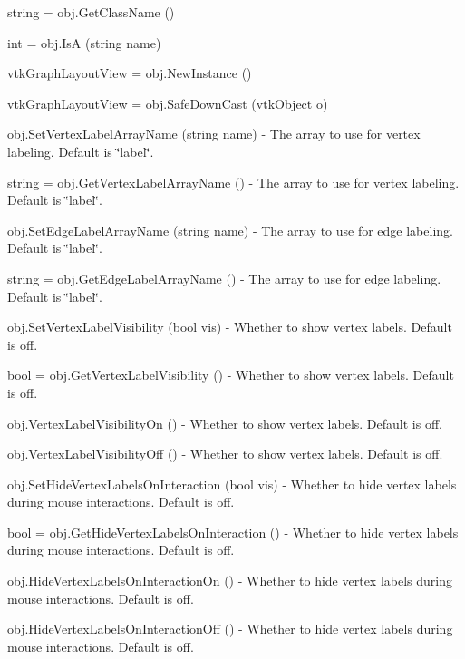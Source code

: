 \begin{DoxyItemize}
\item {\ttfamily string = obj.\-Get\-Class\-Name ()}  
\item {\ttfamily int = obj.\-Is\-A (string name)}  
\item {\ttfamily vtk\-Graph\-Layout\-View = obj.\-New\-Instance ()}  
\item {\ttfamily vtk\-Graph\-Layout\-View = obj.\-Safe\-Down\-Cast (vtk\-Object o)}  
\item {\ttfamily obj.\-Set\-Vertex\-Label\-Array\-Name (string name)} -\/ The array to use for vertex labeling. Default is \char`\"{}label\char`\"{}.  
\item {\ttfamily string = obj.\-Get\-Vertex\-Label\-Array\-Name ()} -\/ The array to use for vertex labeling. Default is \char`\"{}label\char`\"{}.  
\item {\ttfamily obj.\-Set\-Edge\-Label\-Array\-Name (string name)} -\/ The array to use for edge labeling. Default is \char`\"{}label\char`\"{}.  
\item {\ttfamily string = obj.\-Get\-Edge\-Label\-Array\-Name ()} -\/ The array to use for edge labeling. Default is \char`\"{}label\char`\"{}.  
\item {\ttfamily obj.\-Set\-Vertex\-Label\-Visibility (bool vis)} -\/ Whether to show vertex labels. Default is off.  
\item {\ttfamily bool = obj.\-Get\-Vertex\-Label\-Visibility ()} -\/ Whether to show vertex labels. Default is off.  
\item {\ttfamily obj.\-Vertex\-Label\-Visibility\-On ()} -\/ Whether to show vertex labels. Default is off.  
\item {\ttfamily obj.\-Vertex\-Label\-Visibility\-Off ()} -\/ Whether to show vertex labels. Default is off.  
\item {\ttfamily obj.\-Set\-Hide\-Vertex\-Labels\-On\-Interaction (bool vis)} -\/ Whether to hide vertex labels during mouse interactions. Default is off.  
\item {\ttfamily bool = obj.\-Get\-Hide\-Vertex\-Labels\-On\-Interaction ()} -\/ Whether to hide vertex labels during mouse interactions. Default is off.  
\item {\ttfamily obj.\-Hide\-Vertex\-Labels\-On\-Interaction\-On ()} -\/ Whether to hide vertex labels during mouse interactions. Default is off.  
\item {\ttfamily obj.\-Hide\-Vertex\-Labels\-On\-Interaction\-Off ()} -\/ Whether to hide vertex labels during mouse interactions. Default is off.  

\end{DoxyItemize}
